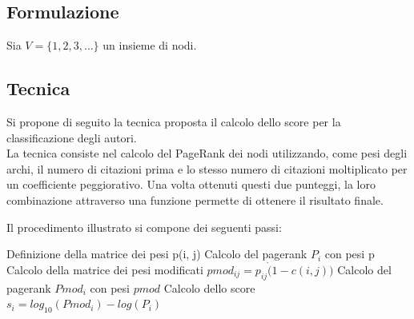 \documentclass[a4paper, 12pt]{article}
\newcommand{\pagerankModificato}{Pmod}
\newcommand{\pesiPagerankModificato}{pmod}
\begin{document}
\subsection{Formulazione}
Sia $ V = \{ 1, 2, 3, \ldots \} $ un insieme di nodi.
\pagebreak
\subsection{Tecnica}
Si propone di seguito la tecnica proposta il calcolo dello score per la classificazione degli autori. \\
La tecnica consiste nel calcolo del PageRank dei nodi utilizzando, come pesi degli archi, il numero di citazioni prima e lo stesso numero di citazioni moltiplicato per un coefficiente peggiorativo. Una volta ottenuti questi due punteggi, la loro combinazione attraverso una funzione permette di ottenere il risultato finale.
\par
Il procedimento illustrato si compone dei seguenti passi:
\begin{algorithm}
Definizione della matrice dei pesi p(i, j)\;
 {
  Calcolo del pagerank $P_{i}$ con pesi p\;
}
Calcolo della matrice dei pesi modificati 
$pmod_{ij} = p_{ij} \dot (1 - c(i, j))$\;
 {
  Calcolo del pagerank $\pagerankModificato_{i}$ con pesi $\pesiPagerankModificato$\;
}
 {
  Calcolo dello score $s_i = log_{10}(\pagerankModificato_{i}) - log(P_{i})$
}
\end{algorithm}
\end{document}
